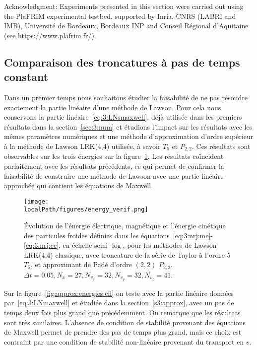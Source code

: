 \begin{otherlanguage}{english}
Acknowledgment: Experiments presented in this section were carried out using the PlaFRIM experimental testbed, supported by Inria, CNRS (LABRI and IMB), Université de Bordeaux, Bordeaux INP and Conseil Régional d’Aquitaine (see \url{https://www.plafrim.fr/}).
\end{otherlanguage}

\subsection{Comparaison des troncatures à pas de temps constant}

Dans un premier temps nous souhaitons étudier la faisabilité de ne pas résoudre exactement la partie linéaire d'une méthode de Lawson. Pour cela nous conservons la partie linéaire~\eqref{eq:3:LNsmaxwell}, déjà utilisée dans les premiers résultats dans la section~\ref{sec:3:num} et étudions l'impact sur les résultats avec les mêmes paramètres numériques et une méthode d'approximation d'ordre supérieur à la méthode de Lawson LRK(4,4) utilisée, à savoir $T_5$ et $P_{2,2}$. Ces résultats sont observables sur les trois énergies sur la figure~\ref{fig:approx:energies4d}. Les résultats coïncident parfaitement avec les résultats précédents, ce qui permet de confirmer la faisabilité de construire une méthode de Lawson avec une partie linéaire approchée qui contient les équations de Maxwell.

\begin{figure}[h]
  \centering
  \texttt{[image: \\localPath/figures/energy\_verif.png]}
  \caption{Évolution de l'énergie électrique, magnétique et l'énergie cinétique des particules froides définies dans les équations~\ref{eq:3:nrj:me}-\ref{eq:3:nrj:ce}, en échelle semi-$\log$, pour les méthodes de Lawson LRK(4,4) classique, avec troncature de la série de Taylor à l'ordre 5 $T_5$, et approximant de Padé d'ordre $(2,2)$ $P_{2,2}$. $\Delta t = 0.05, N_x=27, N_{v_x}=32, N_{v_y}=32, N_{v_z}=41$.}
  \label{fig:approx:energies4d}
\end{figure}

Sur la figure~\ref{fig:approx:energies:cfl} on teste avec la partie linéaire données par~\eqref{eq:3:LNmaxwell} et étudiée dans la section~\ref{s3:approx}, avec un pas de temps deux fois plus grand que précédemment. On remarque que les résultats sont très similaires.  L'absence de condition de stabilité provenant des équations de Maxwell permet de prendre des pas de temps plus grand, mais ce choix est contraint par une condition de stabilité non-linéaire provenant du transport en $v$.

